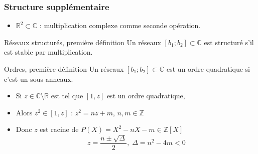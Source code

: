 \documentclass[11pt]{beamer}
\newcommand{\Z}[0]{\mathbb{Z}}
\newcommand{\R}[0]{\mathbb{R}}
\newcommand{\C}[0]{\mathbb{C}}
\begin{document}
	\begin{frame}
		\frametitle{Structure supplémentaire}
		\begin{itemize}
			\item $\R^2\subset\C$ : multiplication complexe comme seconde opération.
		\end{itemize}
		\begin{block}{Réseaux structurés, première définition}
			Un réseaux $[b_1; b_2] \subset \C$ est structuré s'il est stable par multiplication.
		\end{block}
		\begin{block}{Ordres, première définition}
			Un réseaux $[b_1; b_2] \subset \C$ est un ordre quadratique si c'est un sous-anneaux.
		\end{block}
		\begin{itemize}
			\item<2-> Si $z\in\C\setminus\R$ est tel que $[1,z]$ est un ordre quadratique,
			\item<3-> Alors $z^2\in[1,z]$ : $z^2 = nz + m$, $n,m\in\Z$
			\item<3-> Donc $z$ est racine de $P(X) = X^2 - nX - m\in\Z[X]$
			\begin{equation*}
				z = \frac{n \pm \sqrt{\Delta}}{2},\;\Delta=n^2 - 4m < 0
			\end{equation*}
		\end{itemize}
	\end{frame}
		
\end{document}
